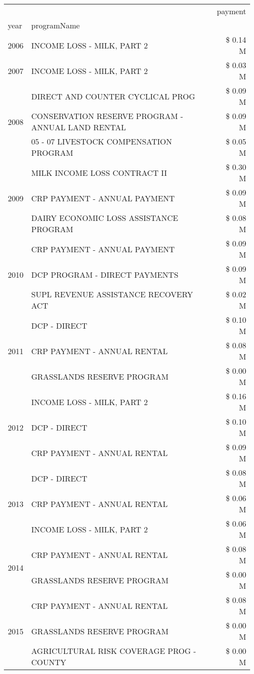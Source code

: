 \begin{tabular}{llr}
\toprule
 &  & payment \\
year & programName &  \\
\midrule
2006 & INCOME LOSS - MILK, PART 2 & \$ 0.14 M \\
\cline{1-3}
2007 & INCOME LOSS - MILK, PART 2 & \$ 0.03 M \\
\cline{1-3}
\multirow[t]{3}{*}{2008} & DIRECT AND COUNTER CYCLICAL PROG & \$ 0.09 M \\
 & CONSERVATION RESERVE PROGRAM - ANNUAL LAND RENTAL & \$ 0.09 M \\
 & 05 - 07 LIVESTOCK COMPENSATION PROGRAM & \$ 0.05 M \\
\cline{1-3}
\multirow[t]{3}{*}{2009} & MILK INCOME LOSS CONTRACT II & \$ 0.30 M \\
 & CRP PAYMENT - ANNUAL PAYMENT & \$ 0.09 M \\
 & DAIRY ECONOMIC LOSS ASSISTANCE PROGRAM & \$ 0.08 M \\
\cline{1-3}
\multirow[t]{3}{*}{2010} & CRP PAYMENT - ANNUAL PAYMENT & \$ 0.09 M \\
 & DCP PROGRAM - DIRECT PAYMENTS & \$ 0.09 M \\
 & SUPL REVENUE ASSISTANCE RECOVERY ACT & \$ 0.02 M \\
\cline{1-3}
\multirow[t]{3}{*}{2011} & DCP - DIRECT & \$ 0.10 M \\
 & CRP PAYMENT - ANNUAL RENTAL & \$ 0.08 M \\
 & GRASSLANDS RESERVE PROGRAM & \$ 0.00 M \\
\cline{1-3}
\multirow[t]{3}{*}{2012} & INCOME LOSS - MILK, PART 2 & \$ 0.16 M \\
 & DCP - DIRECT & \$ 0.10 M \\
 & CRP PAYMENT - ANNUAL RENTAL & \$ 0.09 M \\
\cline{1-3}
\multirow[t]{3}{*}{2013} & DCP - DIRECT & \$ 0.08 M \\
 & CRP PAYMENT - ANNUAL RENTAL & \$ 0.06 M \\
 & INCOME LOSS - MILK, PART 2 & \$ 0.06 M \\
\cline{1-3}
\multirow[t]{2}{*}{2014} & CRP PAYMENT - ANNUAL RENTAL & \$ 0.08 M \\
 & GRASSLANDS RESERVE PROGRAM & \$ 0.00 M \\
\cline{1-3}
\multirow[t]{3}{*}{2015} & CRP PAYMENT - ANNUAL RENTAL & \$ 0.08 M \\
 & GRASSLANDS RESERVE PROGRAM & \$ 0.00 M \\
 & AGRICULTURAL RISK COVERAGE PROG - COUNTY & \$ 0.00 M \\

\end{tabular}
